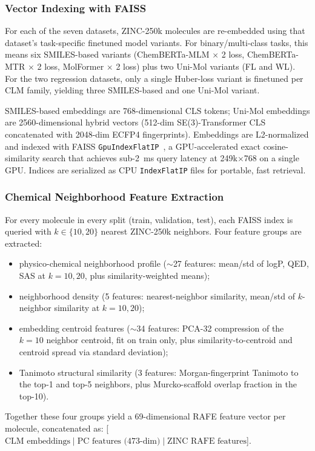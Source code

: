 \documentclass[final,1p,times]{elsarticle}
\begin{document}
\subsubsection{Vector Indexing with FAISS} \label{Vector_FAISS}
For each of the seven datasets, ZINC-250k molecules are re-embedded using that dataset's task-specific finetuned model variants. For binary/multi-class tasks, this means six SMILES-based variants (ChemBERTa-MLM $\times$ 2 loss, ChemBERTa-MTR $\times$ 2 loss, MolFormer $\times$ 2 loss) plus two Uni-Mol variants (FL and WL). For the two regression datasets, only a single Huber-loss variant is finetuned per CLM family, yielding three SMILES-based and one Uni-Mol variant.

SMILES-based embeddings are 768-dimensional CLS tokens; Uni-Mol embeddings are 2560-dimensional hybrid vectors (512-dim SE(3)-Transformer CLS concatenated with 2048-dim ECFP4 fingerprints). Embeddings are L2-normalized and indexed with FAISS \texttt{GpuIndexFlatIP}~\cite{johnson2021faiss}, a GPU-accelerated exact cosine-similarity search that achieves sub-2~ms query latency at 249k$\times$768 on a single GPU. Indices are serialized as CPU \texttt{IndexFlatIP} files for portable, fast retrieval.

\subsubsection{Chemical Neighborhood Feature Extraction} \label{feature_extraction}
For every molecule in every split (train, validation, test), each FAISS index is queried with $k \in \{10, 20\}$ nearest ZINC-250k neighbors. Four feature groups are extracted:
\begin{itemize}
  \item[\textbf{(a)}] physico-chemical neighborhood profile ($\sim$27 features: mean/std of logP, QED, SAS at $k=10,20$, plus similarity-weighted means);
  \item[\textbf{(b)}] neighborhood density (5 features: nearest-neighbor similarity, mean/std of $k$-neighbor similarity at $k=10,20$);
  \item[\textbf{(c)}] embedding centroid features ($\sim$34 features: PCA-32 compression of the $k=10$ neighbor centroid, fit on train only, plus similarity-to-centroid and centroid spread via standard deviation);
  \item[\textbf{(d)}] Tanimoto structural similarity (3 features: Morgan-fingerprint Tanimoto to the top-1 and top-5 neighbors, plus Murcko-scaffold overlap fraction in the top-10).
\end{itemize}
Together these four groups yield a 69-dimensional RAFE feature vector per molecule, concatenated as: [$\text{CLM embeddings} \mid \text{PC features (473-dim)} \mid \text{ZINC RAFE features}$].
\end{document}
